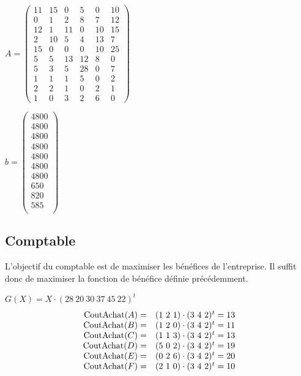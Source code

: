 \documentclass[a4paper, 11pt]{article}
\begin{document}
\begin{minipage}[c]{.49\linewidth}
    \centering
    $A = \begin{pmatrix}
        11&15&0&5&0&10 \\
        0&1&2&8&7&12\\
        12&1&11&0&10&15\\
        2&10&5&4&13&7\\
        15&0&0&0&10&25\\
        5&5&13&12&8&0\\
        5&3&5&28&0&7\\
        1&1&1&5&0&2\\
        2&2&1&0&2&1\\
        1&0&3&2&6&0
    \end{pmatrix}$\\
\end{minipage}
\hfill
\begin{minipage}[c]{.49\linewidth}
    \centering
    $b = \begin{pmatrix}
        4800\\
        4800\\
        4800\\
        4800\\
        4800\\
        4800\\
        4800\\
        650\\
        820\\
        585\\
    \end{pmatrix}$
\end{minipage}

\subsection{Comptable}
L'objectif du comptable est de maximiser les bénéfices de l'entreprise.
Il suffit donc de maximiser la fonction de bénéfice définie précédemment.

$G(X) = X\cdot(28~20~30~37~45~22)^t$ \\

$$
\begin{array}{r l}
    \mbox{CoutAchat}(A) = & (1~2~1)\cdot(3~4~2)^t = 13 \\
    \mbox{CoutAchat}(B) = & (1~2~0)\cdot(3~4~2)^t = 11 \\
    \mbox{CoutAchat}(C) = & (1~1~3)\cdot(3~4~2)^t = 13 \\
    \mbox{CoutAchat}(D) = & (5~0~2)\cdot(3~4~2)^t = 19 \\
    \mbox{CoutAchat}(E) = & (0~2~6)\cdot(3~4~2)^t = 20 \\
    \mbox{CoutAchat}(F) = & (2~1~0)\cdot(3~4~2)^t = 10 \\
\end{array}
$$
\end{document}
